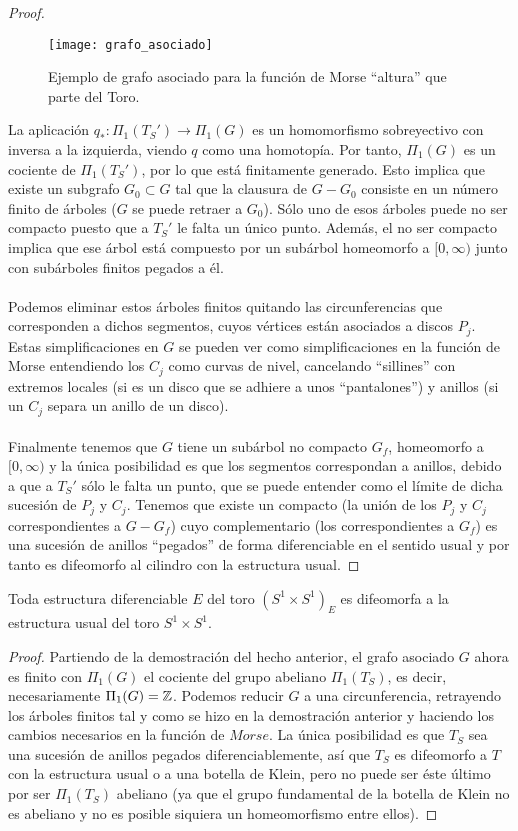 \begin{proof}
\begin{figure}[h]
  	\centering
  	\texttt{[image: grafo\_asociado]}
	\caption{Ejemplo de grafo asociado para la función de Morse ``altura'' que parte del Toro.}
  	\label{fig:grafo}
\end{figure}
	\newpage
	La aplicación $q_*:\Pi_1(T_S') \rightarrow \Pi_1(G)$ es un homomorfismo sobreyectivo con inversa a la izquierda, viendo $q$ como una homotopía. Por tanto, $\Pi_1(G)$ es un cociente de $\Pi_1(T_S')$, por lo que está finitamente generado. Esto implica que existe un subgrafo $G_0 \subset G$ tal que la clausura de $G - G_0$ consiste en un número finito de árboles ($G$ se puede retraer a $G_0$). Sólo uno de esos árboles puede no ser compacto puesto que a $T_S'$ le falta un único punto. Además, el no ser compacto implica que ese árbol está compuesto por un subárbol homeomorfo a $[0, \infty)$ junto con subárboles finitos pegados a él.\\
	\\ Podemos eliminar estos árboles finitos quitando las circunferencias que corresponden a dichos segmentos, cuyos vértices están asociados a discos $P_j$. Estas simplificaciones en $G$ se pueden ver como simplificaciones en la función de Morse entendiendo los $C_j$ como curvas de nivel, cancelando ``sillines''  con extremos locales (si es un disco que se adhiere a unos ``pantalones'') y anillos (si un $C_j$ separa un anillo de un disco). \\
	\\ Finalmente tenemos que $G$ tiene un subárbol no compacto $G_f$, homeomorfo a $[0, \infty)$ y la única posibilidad es que los segmentos correspondan a anillos, debido a que a $T_S'$ sólo le falta un punto, que se puede entender como el límite de dicha sucesión de $P_j$ y $C_j$. Tenemos que existe un compacto (la unión de los $P_j$ y $C_j$ correspondientes a $G - G_f$) cuyo complementario (los correspondientes a $G_f$) es una sucesión de anillos ``pegados'' de forma diferenciable en el sentido usual y por tanto es difeomorfo al cilindro con la estructura usual.
\end{proof}

\begin{hecho}
	Toda estructura diferenciable $E$ del toro $(S^1 \times S^1)_E$ es difeomorfa a la estructura usual del toro $S^1 \times S^1$.
\end{hecho}

\begin{proof}
	Partiendo de la demostración del hecho anterior, el grafo asociado $G$ ahora es finito con $\Pi_1(G)$ el cociente del grupo abeliano $\Pi_1(T_S)$, es decir, necesariamente $\Pi_1(G) = \mathbb{Z}$. Podemos reducir $G$ a una circunferencia, retrayendo los árboles finitos tal y como se hizo en la demostración anterior y haciendo los cambios necesarios en la función de $Morse$. La única posibilidad es que $T_S$ sea una sucesión de anillos pegados diferenciablemente, así que $T_S$ es difeomorfo a $T$ con la estructura usual o a una botella de Klein, pero no puede ser éste último por ser $\Pi_1(T_S)$ abeliano (ya que el grupo fundamental de la botella de Klein no es abeliano y no es posible siquiera un homeomorfismo entre ellos).
\end{proof}

